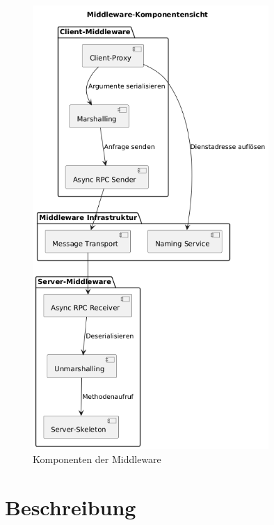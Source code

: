 \begin{figure}[htbp]
	\centering
	\includegraphics[width=0.8\textwidth]{diagrams/bausteinsicht.png}
	\caption{Komponenten der Middleware}
	\label{fig:meine-abbildung}
\end{figure}


\section*{Beschreibung}